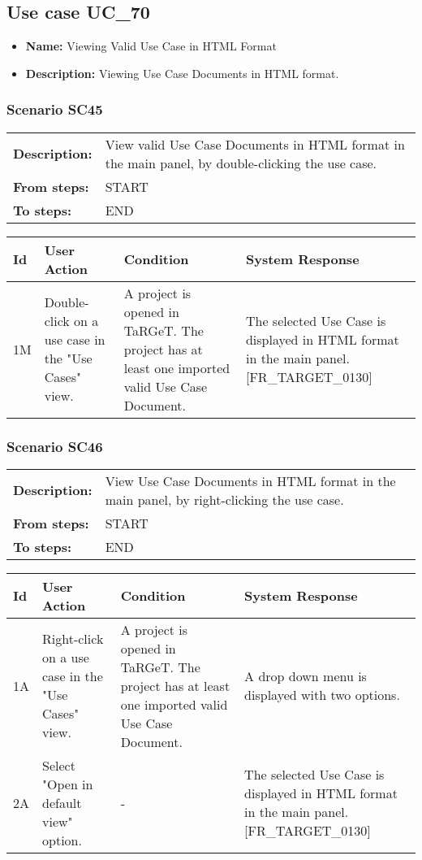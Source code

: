 \documentclass[a4paper,11pt]{article}
\newcommand{\bl}{\\ \hline}
\begin{document}
\subsection*{Use case UC_70}
\begin{itemize}
\item {\bf Name: }Viewing Valid Use Case in HTML Format
\item {\bf Description: } Viewing Use Case Documents in HTML format.
			
\end{itemize}
\subsubsection*{Scenario SC45}
\begin{tabular}{p{1in}p{4in}}
{\bf Description:} & View valid Use Case Documents in HTML format in the
					main panel, by double-clicking the use case. \\
{\bf From steps:} & START \\
{\bf To steps:} & END \\
\end{tabular}
 
\begin{tabular}{|p{0.8in}|p{1.6in}|p{1.6in}|p{1.6in}|}
\hline
Id & User Action & Condition & System Response  \bl 
1M & Double-click on a use case in the "Use Cases" view.
					 & A project is opened in TaRGeT. The project has at least
						one imported valid Use Case Document.  & The selected Use Case is displayed in HTML format in the
						main panel. [FR_TARGET_0130] \bl 
\end{tabular}
\subsubsection*{Scenario SC46}
\begin{tabular}{p{1in}p{4in}}
{\bf Description:} & View Use Case Documents in HTML format in the main
					panel, by right-clicking the use case. \\
{\bf From steps:} & START \\
{\bf To steps:} & END \\
\end{tabular}
 
\begin{tabular}{|p{0.8in}|p{1.6in}|p{1.6in}|p{1.6in}|}
\hline
Id & User Action & Condition & System Response  \bl 
1A & Right-click on a use case in the "Use Cases" view. & A project is opened in TaRGeT. The project has at least
						one imported valid Use Case Document. & A drop down menu is displayed with two options.
					 \bl 
2A & Select "Open in default view" option. & - & The selected Use Case is displayed in HTML format in the
						main panel. [FR_TARGET_0130]  \bl 
\end{tabular}
\end{document}
